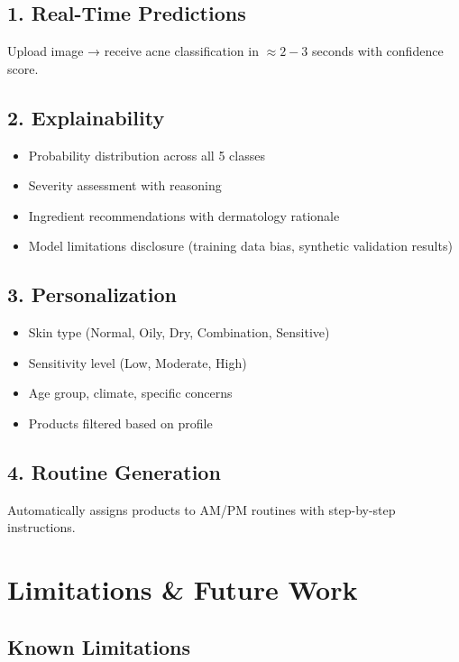\documentclass[12pt,a4paper]{article}
\begin{document}
\subsection{1. Real-Time Predictions}

Upload image → receive acne classification in $\approx 2-3$ seconds with confidence score.

\subsection{2. Explainability}

\begin{itemize}
    \item Probability distribution across all 5 classes
    \item Severity assessment with reasoning
    \item Ingredient recommendations with dermatology rationale
    \item Model limitations disclosure (training data bias, synthetic validation results)
\end{itemize}

\subsection{3. Personalization}

\begin{itemize}
    \item Skin type (Normal, Oily, Dry, Combination, Sensitive)
    \item Sensitivity level (Low, Moderate, High)
    \item Age group, climate, specific concerns
    \item Products filtered based on profile
\end{itemize}

\subsection{4. Routine Generation}

Automatically assigns products to AM/PM routines with step-by-step instructions.

\section{Limitations \& Future Work}

\subsection{Known Limitations}
\end{document}
